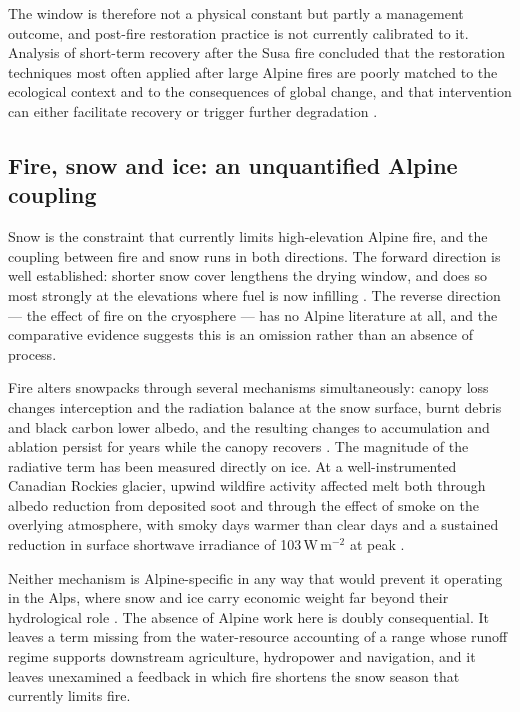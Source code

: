 \documentclass[11pt,a4paper]{article}
\begin{document}
The window is therefore not a physical constant but partly a management outcome, and post-fire restoration practice is not currently calibrated to it. Analysis of short-term recovery after the Susa fire concluded that the restoration techniques most often applied after large Alpine fires are poorly matched to the ecological context and to the consequences of global change, and that intervention can either facilitate recovery or trigger further degradation \citep{mantero_short-term_2023}.

\subsection{Fire, snow and ice: an unquantified Alpine coupling}

Snow is the constraint that currently limits high-elevation Alpine fire, and the coupling between fire and snow runs in both directions. The forward direction is well established: shorter snow cover lengthens the drying window, and does so most strongly at the elevations where fuel is now infilling \citep{rangwala_climate_2012, frei_evidence_2023, pede_mountain_2022}. The reverse direction --- the effect of fire on the cryosphere --- has no Alpine literature at all, and the comparative evidence suggests this is an omission rather than an absence of process.

Fire alters snowpacks through several mechanisms simultaneously: canopy loss changes interception and the radiation balance at the snow surface, burnt debris and black carbon lower albedo, and the resulting changes to accumulation and ablation persist for years while the canopy recovers \citep{koshkin_wildfire_2022}. The magnitude of the radiative term has been measured directly on ice. At a well-instrumented Canadian Rockies glacier, upwind wildfire activity affected melt both through albedo reduction from deposited soot and through the effect of smoke on the overlying atmosphere, with smoky days warmer than clear days and a sustained reduction in surface shortwave irradiance of 103\,W\,m$^{-2}$ at peak \citep{aubrywake_fire_2022}.

Neither mechanism is Alpine-specific in any way that would prevent it operating in the Alps, where snow and ice carry economic weight far beyond their hydrological role \citep{pede_mountain_2022}. The absence of Alpine work here is doubly consequential. It leaves a term missing from the water-resource accounting of a range whose runoff regime supports downstream agriculture, hydropower and navigation, and it leaves unexamined a feedback in which fire shortens the snow season that currently limits fire.
\end{document}
